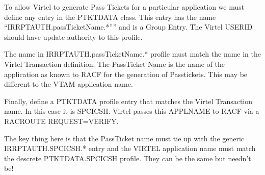 \documentclass[letterpaper,10pt,english]{sphinxmanual}
\begin{document}
To allow Virtel to generate Pass Tickets for a particular application we must define any entry in the PTKTDATA class. This entry has the name “IRRPTAUTH.passTicketName.*”” and is a Group Entry. The Virtel USERID should have update authority to this profile.

 

\begin{sphinxVerbatim}[commandchars=\\\{\}]
  \PYGZbs{} 
 \PYGZbs{}   
 
\end{sphinxVerbatim}

The name in IRRPTAUTH.passTicketName.* profile must match the name in the Virtel Transaction definition. The PassTicket Name is the name of the application as known to RACF for the generation of Passtickets. This may be different to the VTAM application name.

Finally, define a PTKTDATA profile entry that matches the Virtel Transaction  name. In this case it is SPCICSH. Virtel passes this APPLNAME to RACF via a RACROUTE REQUEST=VERIFY.

 

\begin{sphinxVerbatim}[commandchars=\\\{\}]
    
\end{sphinxVerbatim}

The key thing here is that the PassTicket name must tie up with the generic IRRPTAUTH.SPCICSH.* entry and the VIRTEL application name must match the descrete PTKTDATA.SPCICSH profile. They can be the same but needn’t be!
\end{document}
